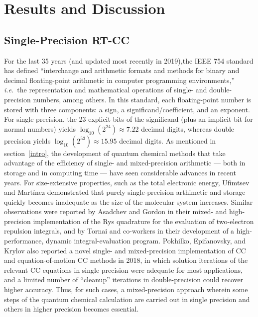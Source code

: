 \section{Results and Discussion} \label{results}

\subsection{Single-Precision RT-CC}\label{result:precision}

For the last 35 years (and updated most recently in 2019),the IEEE 754
standard\cite{IEEE-754-2019} has defined ``interchange and arithmetic formats
and methods for binary and decimal floating-point arithmetic in computer
programming environments,'' {\em i.e.}\ the representation and mathematical
operations of single- and double-precision numbers, among others.  In this
standard, each floating-point number is stored with three components: a sign, a
significand/coefficient, and an exponent.  For single precision, the 23 explicit
bits of the significand (plus an implicit bit for normal numbers) yields
$\log_{10}(2^{24}) \approx 7.22$ decimal digits, whereas double precision
yields $\log_{10}(2^{53}) \approx 15.95$ decimal digits.  As mentioned in
section~\ref{intro}, the development of quantum chemical methods that take
advantage of the efficiency of single- and mixed-precision arithmetic --- both
in storage and in computing time --- have seen considerable advances in recent
years.  For size-extensive properties, such as the total electronic energy,
Ufimtsev and Mart\' inez\cite{Ufimtsev2008,Ufimtsev2008quantum} demonstrated that
purely single-precision arthimetic and storage quickly becomes inadequate as the
size of the molecular system increases.  Similar observations were reported by
Asadchev and Gordon\cite{Asadchev2012} in their mixed- and high-precision
implementation of the Rys quadrature for the evaluation of two-electron
repulsion integrals, and by Tornai and co-workers in their development of a
high-performance, dynamic integral-evaluation program.\cite{Tornai2019}
Pokhilko, Epifanovsky, and Krylov\cite{Pokhilko2018} also reported a novel
single- and mixed-precision implementation of CC and equation-of-motion CC
methods in 2018, in which solution iterations of the relevant CC equations in
single precision were adequate for most applications, and a limited number of
``cleanup'' iterations in double-precision could recover higher accuracy.  Thus,
for such cases, a mixed-precision approach wherein some steps of the quantum
chemical calculation are carried out in single precision and others in higher
precision becomes essential.  

